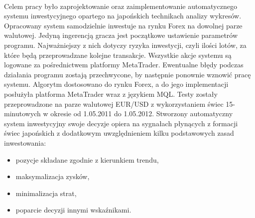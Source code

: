 \documentclass[pdflatex,11pt]{aghdpl}
\begin{document}
\paragraph{}
Celem pracy było zaprojektowanie oraz zaimplementowanie automatycznego systemu inwestycyjnego opartego na japońskich technikach analizy wykresów. Opracowany system samodzielnie inwestuje na rynku Forex na dowolnej parze walutowej. Jedyną ingerencją gracza jest początkowe ustawienie parametrów programu. Najważniejszy z nich dotyczy ryzyka inwestycji, czyli ilości lotów, za które będą przeprowadzane kolejne transakcje. Wszystkie akcje systemu są logowane za pośrednictwem platformy MetaTrader. Ewentualne błędy podczas działania programu zostają przechwycone, by następnie ponownie wznowić pracę systemu. Algorytm dostosowano do rynku Forex, a do jego implementacji posłużyła platforma MetaTrader wraz z językiem MQL. Testy zostały przeprowadzone na parze walutowej EUR/USD z wykorzystaniem świec 15-minutowych w okresie od 1.05.2011 do 1.05.2012. Stworzony automatyczny system inwestycyjny swoje decyzje opiera na sygnałach płynących z formacji świec japońskich z dodatkowym uwzględnieniem kilku podstawowych zasad inwestowania: 
\begin{itemize}
\item pozycje składane zgodnie z kierunkiem trendu,
\item maksymalizacja zysków,
\item minimalizacja strat,
\item poparcie decyzji innymi wskaźnikami.
\end{itemize}
\end{document}
